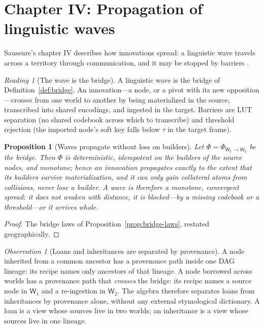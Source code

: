 \documentclass[11pt,a4paper]{article}
\newtheorem{proposition}[principle]{Proposition}
\theoremstyle{remark}
\newtheorem{observation}[principle]{Observation}
\newtheorem{reading}[principle]{Reading}
\newcommand{\World}{\ensuremath{\mathsf{W}}}             %
\newcommand{\Bridge}{\ensuremath{\Phi}}                  %
\begin{document}
\section{Chapter IV: Propagation of linguistic waves}
\label{sec:ch4}

Saussure's chapter IV describes how innovations spread: a linguistic wave
travels across a territory through communication, and it may be stopped by
barriers \cite[Part IV, ch.~IV]{harris1983}.

\begin{reading}[The wave is the bridge]
\label{read:wave}
A linguistic wave is the bridge of Definition~\ref{def:bridge}. An
innovation---a node, or a pivot with its new opposition---crosses from one
world to another by being materialized in the source, transcribed into shared
encodings, and ingested in the target. Barriers are LUT separation (no shared
codebook across which to transcribe) and threshold rejection (the imported
node's soft key falls below $\tau$ in the target frame).
\end{reading}

\begin{proposition}[Waves propagate without loss on builders]
\label{prop:wave}
Let $\Bridge = \Bridge_{\World_1\to\World_2}$ be the bridge. Then
$\Bridge$ is deterministic, idempotent on the builders of the source nodes,
and monotone; hence an innovation propagates exactly to the extent that its
builders survive materialization, and it can only gain collateral atoms from
collisions, never lose a builder. A wave is therefore a monotone, convergent
spread: it does not weaken with distance, it is \emph{blocked}---by a missing
codebook or a threshold---or it arrives whole.
\end{proposition}

\begin{proof}
The bridge laws of Proposition~\ref{prop:bridge-laws}, restated
geographically.
\end{proof}

\begin{observation}[Loans and inheritances are separated by provenance]
\label{obs:loans}
A node inherited from a common ancestor has a provenance path inside one DAG
lineage: its recipe names only ancestors of that lineage. A node borrowed
across worlds has a provenance path that \emph{crosses} the bridge: its
recipe names a source node in $\World_1$ and a re-ingestion in $\World_2$.
The algebra therefore separates loans from inheritances by provenance alone,
without any external etymological dictionary. A loan is a view whose sources
live in two worlds; an inheritance is a view whose sources live in one
lineage.
\end{observation}
\end{document}
